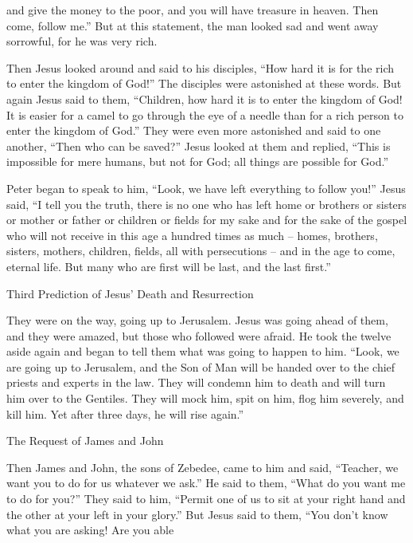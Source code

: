 {and
give
the money to the poor,
and
you will have
treasure
in
heaven.
Then
come,
follow
me.”
But
at
this statement,
the man looked sad
and went away
sorrowful,
for
he was
very
rich.
\par }{\PP {}Then
Jesus
looked around
and said
to his
disciples,
“How
hard
it is for the rich
to
enter
the kingdom
of God!”
The disciples
were astonished
at
these
words.
But
again
Jesus
said
to them, “Children,
how
hard
it is
to
enter
the kingdom
of God!
It is
easier
for a camel
to go
through
the eye
of a needle
than
for a rich person
to enter
the kingdom
of God.”
They were
even more
astonished
and said
to
one another,
“Then
who
can
be saved?”
Jesus
looked at
them
and replied,
“This is impossible
for
mere humans,
but
not
for
God;
all things
are possible
for
God.”
\par }{\PP {}Peter
began
to speak
to him,
“Look,
we
have left
everything
to follow
you!”
Jesus
said,
“I tell
you
the truth,
there is
no one
who
has left
home
or
brothers
or
sisters
or
mother
or
father
or
children
or
fields
for
my
sake
and
for the sake
of the gospel
who
will
not
receive
in
this
age
a hundred times as much – homes, brothers, sisters, mothers, children, fields, all with persecutions – and in the age to come, eternal life.
But
many
who are
first
will be last,
and
the last
first.”
\par }{\SH Third Prediction of Jesus’ Death and Resurrection
\par }{\PP {}They were
on
the way,
going up
to
Jerusalem.
Jesus
was
going ahead of
them,
and
they were amazed,
but
those who followed
were afraid.
He
took
the twelve
aside
again
and began
to tell
them
what was going
to happen
to him.
“Look,
we are going up
to
Jerusalem,
and
the Son
of Man
will be handed over
to the chief priests
and
experts in the law.
They will condemn
him
to death
and
will turn
him
over
to the Gentiles.
They will mock
him,
spit
on him,
flog
him
severely,
and
kill
him. Yet
after
three
days,
he will rise again.”
\par }{\SH The Request of James and John
\par }{\PP {}Then
James
and
John,
the sons
of Zebedee,
came
to
him
and said,
“Teacher,
we want
you
to do
for us
whatever
we ask.”
He said
to them,
“What
do you want
me to do
for you?”
They said
to him,
“Permit
one
of us
to sit
at
your
right hand
and
the other
at
your left
in
your
glory.”
But
Jesus
said
to them,
“You
don’t
know
what
you are asking! Are you able
}
